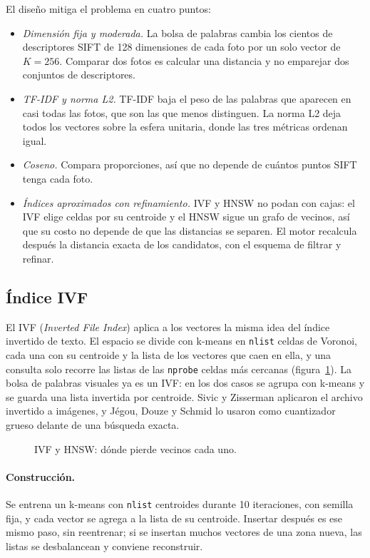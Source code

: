 \documentclass[11pt,a4paper]{article}
\begin{document}
El diseño mitiga el problema en cuatro puntos:
\begin{itemize}
  \item \emph{Dimensión fija y moderada.} La bolsa de palabras cambia los cientos de descriptores SIFT de 128 dimensiones de cada foto por un solo vector de $K = 256$. Comparar dos fotos es calcular una distancia y no emparejar dos conjuntos de descriptores.
  \item \emph{TF-IDF y norma L2.} TF-IDF baja el peso de las palabras que aparecen en casi todas las fotos, que son las que menos distinguen. La norma L2 deja todos los vectores sobre la esfera unitaria, donde las tres métricas ordenan igual.
  \item \emph{Coseno.} Compara proporciones, así que no depende de cuántos puntos SIFT tenga cada foto.
  \item \emph{Índices aproximados con refinamiento.} IVF y HNSW no podan con cajas: el IVF elige celdas por su centroide y el HNSW sigue un grafo de vecinos, así que su costo no depende de que las distancias se separen. El motor recalcula después la distancia exacta de los candidatos, con el esquema de filtrar y refinar.
\end{itemize}

\subsection{Índice IVF}

El IVF (\emph{Inverted File Index}) aplica a los vectores la misma idea del índice invertido de texto. El espacio se divide con k-means en \texttt{nlist} celdas de Voronoi, cada una con su centroide y la lista de los vectores que caen en ella, y una consulta solo recorre las listas de las \texttt{nprobe} celdas más cercanas (figura~\ref{fig:ivf-hnsw}). La bolsa de palabras visuales ya es un IVF: en los dos casos se agrupa con k-means y se guarda una lista invertida por centroide. Sivic y Zisserman aplicaron el archivo invertido a imágenes, y Jégou, Douze y Schmid lo usaron como cuantizador grueso delante de una búsqueda exacta.

\begin{figure}[!htbp]
\centering

\caption{IVF y HNSW: dónde pierde vecinos cada uno.}
\label{fig:ivf-hnsw}
\end{figure}

\paragraph{Construcción.} Se entrena un k-means con \texttt{nlist} centroides durante 10 iteraciones, con semilla fija, y cada vector se agrega a la lista de su centroide. Insertar después es ese mismo paso, sin reentrenar; si se insertan muchos vectores de una zona nueva, las listas se desbalancean y conviene reconstruir.
\end{document}
